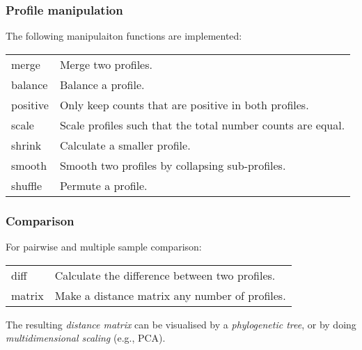 \documentclass[slidestop]{beamer}
\begin{document}
\begin{frame}
  \frametitle{Profile manipulation}

  The following manipulaiton functions are implemented:
  \begin{tabular}{@{\fakeitem}p{3cm}p{7cm}}
    merge       & Merge two profiles.\\
    balance     & Balance a profile.\\
    positive    & Only keep counts that are positive in both profiles.\\
    scale       & Scale profiles such that the total number counts are equal.\\
    shrink      & Calculate a smaller profile.\\
    smooth      & Smooth two profiles by collapsing sub-profiles.\\
    shuffle     & Permute a profile.\\
  \end{tabular}
\end{frame}

\begin{frame}
  \frametitle{Comparison}

  For pairwise and multiple sample comparison:
  \begin{tabular}{@{\fakeitem}p{3cm}p{7cm}}
    diff        & Calculate the difference between two profiles.\\
    matrix      & Make a distance matrix any number of profiles.\\
  \end{tabular}
  \bigskip
  \pause

  The resulting \emph{distance matrix} can be visualised by a
  \emph{phylogenetic tree}, or by doing \emph{multidimensional scaling} (e.g.,
  PCA).
\end{frame}
\end{document}
